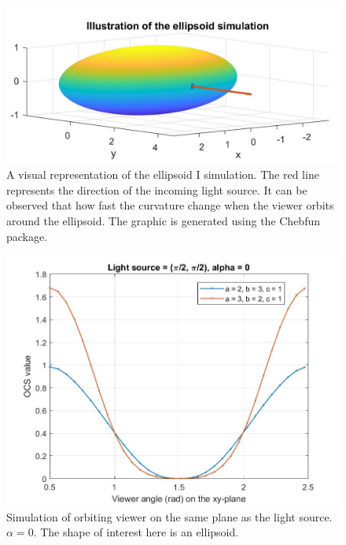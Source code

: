 \documentclass[11pt]{amsart}
\theoremstyle{definition}
\begin{document}
\begin{figure}[h]
\includegraphics[scale=0.35]{./figs/OCS_ellipsoid}
\caption{A visual representation of the ellipsoid I simulation. The red line represents the direction of the incoming light source. It can be observed that how fast the curvature change when the viewer orbits around the ellipsoid. The graphic is generated using the Chebfun package.}
\label{OCSEllipsoid}
\end{figure}

\begin{figure}[h]
\includegraphics[scale=0.32]{./figs/OCS_parallel_plane_ellipsoid}
\caption{Simulation of orbiting viewer on the same plane as the light source. $\alpha = 0$. The shape of interest here is an ellipsoid.}
\label{OCSParallelPlaneEllipsoid}
\end{figure}
\end{document}
